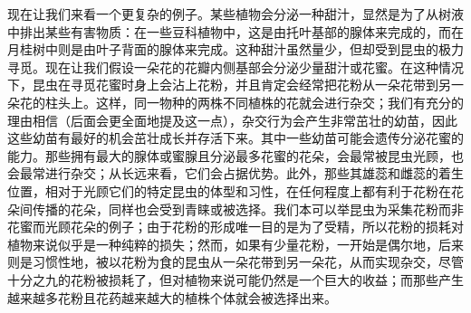 \documentclass{article}
\begin{document}
现在让我们来看一个更复杂的例子。某些植物会分泌一种甜汁，显然是为了从树液中排出某些有害物质：在一些豆科植物中，这是由托叶基部的腺体来完成的，而在月桂树中则是由叶子背面的腺体来完成。这种甜汁虽然量少，但却受到昆虫的极力寻觅。现在让我们假设一朵花的花瓣内侧基部会分泌少量甜汁或花蜜。在这种情况下，昆虫在寻觅花蜜时身上会沾上花粉，并且肯定会经常把花粉从一朵花带到另一朵花的柱头上。这样，同一物种的两株不同植株的花就会进行杂交；我们有充分的理由相信（后面会更全面地提及这一点），杂交行为会产生非常茁壮的幼苗，因此这些幼苗有最好的机会茁壮成长并存活下来。其中一些幼苗可能会遗传分泌花蜜的能力。那些拥有最大的腺体或蜜腺且分泌最多花蜜的花朵，会最常被昆虫光顾，也会最常进行杂交；从长远来看，它们会占据优势。此外，那些其雄蕊和雌蕊的着生位置，相对于光顾它们的特定昆虫的体型和习性，在任何程度上都有利于花粉在花朵间传播的花朵，同样也会受到青睐或被选择。我们本可以举昆虫为采集花粉而非花蜜而光顾花朵的例子；由于花粉的形成唯一目的是为了受精，所以花粉的损耗对植物来说似乎是一种纯粹的损失；然而，如果有少量花粉，一开始是偶尔地，后来则是习惯性地，被以花粉为食的昆虫从一朵花带到另一朵花，从而实现杂交，尽管十分之九的花粉被损耗了，但对植物来说可能仍然是一个巨大的收益；而那些产生越来越多花粉且花药越来越大的植株个体就会被选择出来。 
\end{document}
